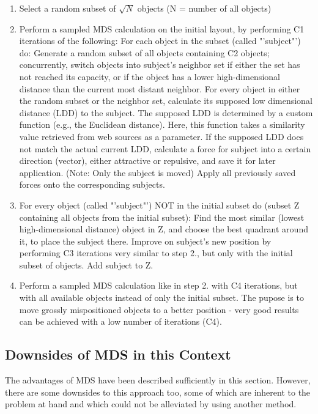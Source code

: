 \begin{enumerate}
	\item Select a random subset of $\sqrt{N}$ objects (N = number of all objects)
	\item Perform a sampled MDS calculation on the initial layout, by performing C1 iterations of the following:
		\subitem For each object in the subset (called "'subject"') do:
			\subsubitem Generate a random subset of all objects containing C2 objects; concurrently, switch objects into subject's neighbor set if either the set has not reached its capacity, or if the object has a lower high-dimensional distance than the current most distant neighbor.
			\subsubitem For every object in either the random subset or the neighbor set, calculate its supposed low dimensional distance (LDD) to the subject. The supposed LDD is determined by a custom function (e.g., the Euclidean distance). Here, this function takes a similarity value retrieved from web sources as a parameter.
			\subsubitem If the supposed LDD does not match the actual current LDD, calculate a force for subject into a certain direction (vector), either attractive or repulsive, and save it for later application. (Note: Only the subject is moved)
		\subitem Apply all previously saved forces onto the corresponding subjects.
	\item For every object (called "'subject"') NOT in the initial subset do (subset Z containing all objects from the initial subset):
		\subitem Find the most similar (lowest high-dimensional distance) object in Z, and choose the best quadrant around it, to place the subject there. 
		\subitem Improve on subject's new position by performing C3 iterations very similar to step 2., but only with the initial subset of objects.
		\subitem Add subject to Z.
	\item Perform a sampled MDS calculation like in step 2. with C4 iterations, but with all available objects instead of only the initial subset. The pupose is to move grossly mispositioned objects to a better position - very good results can be achieved with a low number of iterations (C4).
		
\end{enumerate}

\subsection{Downsides of MDS in this Context}

The advantages of MDS have been described sufficiently in this section. However, there are some downsides to this approach too, some of which are inherent to the problem at hand and which could not be alleviated by using another method.

